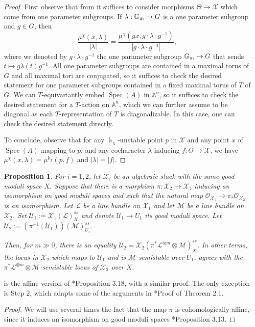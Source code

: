 \documentclass{amsart}
\newcommand{\bA}{\mathbb{A}}
\newcommand{\bG}{\mathbb{G}}
\newcommand{\cL}{\mathcal{L}}
\newcommand{\cM}{\mathcal{M}}
\newcommand{\cO}{\mathcal{O}}
\newcommand{\cU}{\mathcal{U}}
\newcommand{\cX}{\mathcal{X}}
\newcommand{\spec}{\operatorname{Spec}}
\newcommand{\Gm}{\bG_{{\rm m}}}
\newtheorem{Prop}[theorem]{Proposition}
\theoremstyle{definition}
\theoremstyle{definition}
\begin{document}
{\begin{proof}
    First observe that from 
    it suffices to consider morphisms $\Theta\to \cX$ which come from one parameter subgroups. If $\lambda:\Gm\to G$ is a one parameter subgroup and $g\in G$, then $$\frac{\mu^{\chi}(x,\lambda)}{|\lambda|} = \frac{\mu^{\chi}(gx,g\cdot\lambda\cdot g^{-1})}{|g\cdot\lambda\cdot g^{-1}|},$$ where we denoted by $g\cdot\lambda\cdot g^{-1}$ the one parameter subgroup $\Gm\to G$ that sends $t\mapsto g\lambda(t)g^{-1}$.
        All one parameter subgroups are contained in a maximal torus of $G$ and all maximal tori are conjugated, so it suffices to check the desired statement for one parameter subgroups contained in a fixed maximal torus of $T$ of $G$. We can $T$-equivariantly embed $\spec(A)$ in $\bA^n$, so it suffices to check the desired statement for a $T$-action on $\bA^n$, which we can further assume to be diagonal as each $T$-representation of $T$ is diagonalizable. In this case, one can check the desired statement directly.

    
    To conclude, observe that for any $\Bbbk_\chi$-unstable point $p$ in $\cX$ and any point $x$ of $\spec(A)$ mapping to $p$, and any cocharacter $\lambda$ inducing $f\colon\Theta\to \cX$, we have $\mu^{\chi}(x,\lambda)=\mu^{\Bbbk_\chi}(p,f)$ and $|\lambda|=|f|$.
 \end{proof}


\begin{Prop}\label{prop_stable_locus_of_pi*L^n_otimes_G}
    For $i=1,2$, let $\cX_i$ be an algebraic stack with the same good moduli space $X$. Suppose that there is a morphism $\pi:\cX_2\to \cX_1$ inducing an isomorphism on good moduli spaces and such that the natural map $\cO_{\cX_1}\to \pi_*\cO_{\cX_2}$ is an isomorphism. Let $\cL$ be a line bundle on $\cX_1$ and let $\cM$ be a line bundle on $\cX_2$. Set $\cU_1:=\cX_1(\cL)^{ss}_{X}$ and denote $\cU_1\to U_1$ its good moduli space. Let $\cU_2:=(\pi^{-1}(\cU_1))(\cM)^{ss}_{U_1}$.
    
    Then, for $m\gg 0$, there is an equality $\cU_2 = \cX_2(\pi^*\cL^{\otimes m}\otimes \cM)^{ss}_{X}$. In other terms, the locus in $\cX_2$ which maps to $\cU_1$ and is $\cM$-semistable over $U_1$, agrees with the $\pi^*\cL^{\otimes m}\otimes \cM$-semistable locus of $\cX_2$ over $X$. 
\end{Prop}
 is the affine version of \cite{ER21}*{Proposition 3.18}, with a similar proof. The only exception is Step 2, which adapts some of the arguments in \cite{reichstein1989stability}*{Proof of Theorem 2.1}.
\begin{proof}
We will use several times the fact that the map $\pi$ is cohomologically affine, since it induces an isomorphism on good moduli spaces \cite{Alp}*{Proposition 3.13}.


\end{proof}}
\end{document}
